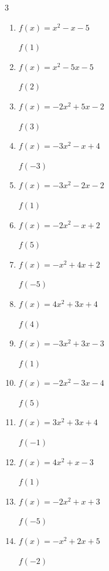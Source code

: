 \begin{multicols}{3}
\begin{enumerate}
  \item $f(x)=x^{2}-x-5$

$f(1)$
        \phantom{$= -5$}

  \item $f(x)=x^{2}-5x-5$

$f(2)$
        \phantom{$= -11$}

  \item $f(x)=-2x^{2}+5x-2$

$f(3)$
        \phantom{$= -5$}

\columnbreak %

  \item $f(x)=-3x^{2}-x+4$

$f(-3)$
        \phantom{$= -20$}

  \item $f(x)=-3x^{2}-2x-2$

$f(1)$
        \phantom{$= -7$}

  \item $f(x)=-2x^{2}-x+2$

$f(5)$
        \phantom{$= -53$}

  \item $f(x)=-x^{2}+4x+2$

$f(-5)$
        \phantom{$= -43$}

  \item $f(x)=4x^{2}+3x+4$

$f(4)$
        \phantom{$= 80$}

  \item $f(x)=-3x^{2}+3x-3$

$f(1)$
        \phantom{$= -3$}

  \item $f(x)=-2x^{2}-3x-4$

$f(5)$
        \phantom{$= -69$}

  \item $f(x)=3x^{2}+3x+4$

$f(-1)$
        \phantom{$= 4$}

  \item $f(x)=4x^{2}+x-3$

$f(1)$
        \phantom{$= 2$}

  \item $f(x)=-2x^{2}+x+3$

$f(-5)$
        \phantom{$= -52$}

  \item $f(x)=-x^{2}+2x+5$

$f(-2)$
        \phantom{$= -3$}


\end{enumerate}
\end{multicols}
